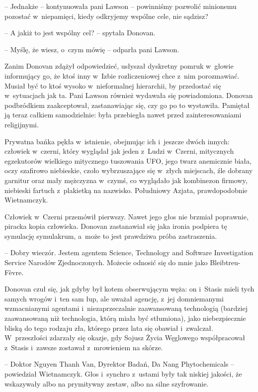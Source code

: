 \documentclass[oneside,polish,11pt,sfheadings]{mwbk}
\begin{document}
-- Jednakże -- kontynuowała pani Lawson -- powinniśmy pozwolić minionemu
pozostać w~niepamięci, kiedy odkryjemy wspólne cele, nie sądzisz?

-- A jakiż to jest wspólny cel? -- spytała Donovan.

-- Myślę, że wiesz, o~czym mówię -- odparła pani Lawson.

Zanim Donovan zdążył odpowiedzieć, usłyszał dyskretny pomruk w~głowie
informujący go, że ktoś inny w~Izbie rozliczeniowej chce z~nim
porozmawiać. Musiał być to ktoś wysoko w~nieformalnej hierarchii, by
przedostać się w~sytuacjach jak ta. Pani Lawson również wydawała się
powiadomiona. Donovan podbródkiem zaakceptował, zastanawiając się, czy
go po to wystawiła. Pamiętał ją teraz całkiem samodzielnie: była
przebiegła nawet przed zainteresowaniami religijnymi.

Prywatna bańka pękła w~istnienie, obejmując ich i~jeszcze dwóch innych:
człowiek w~czerni, który wyglądał jak jeden z~Ludzi w~Czerni, mitycznych
egzekutorów wielkiego mitycznego tuszowania UFO, jego twarz anemicznie
biała, oczy szafirowo niebieskie, czoło wybrzuszające się w~złych
miejscach, źle dobrany garnitur oraz mały mężczyzna w~czymś, co
wyglądało jak kombinezon firmowy, niebieski fartuch z~plakietką na
nazwisko. Południowy Azjata, prawdopodobnie Wietnamczyk.

Człowiek w~Czerni przemówił pierwszy. Nawet jego głos nie brzmiał
poprawnie, piracka kopia człowieka. Donovan zastanawiał się jaka ironia
podpiera tę symulację symulakrum, a~może to jest prawdziwa próba
zastraszenia.

-- Dobry wieczór. Jestem agentem Science, Technology and Software
Investigation Service Narodów Zjednoczonych. Możecie odnosić się do mnie
jako Bleibtreu-Fèvre.

Donovan czuł się, jak gdyby był kotem obserwującym węża: on i~Stasis
mieli tych samych wrogów i~ten sam łup, ale uważał agencję, z~jej
domniemanymi wzmacnianymi agentami i~niezaprzeczalnie zaawansowaną
technologią (bardziej zaawansowaną niż technologia, którą miała być
stłumiona), jako niebezpiecznie bliską do tego rodzaju zła, którego
przez lata się obawiał i~zwalczał. W~przeszłości zdarzały się okazje,
gdy Sojusz Życia Węglowego współpracował z~Stasis i~zawsze zostawał z~mrowieniem na skórze.

-- Doktor Nguyen Thanh Van, Dyrektor Badań, Da Nang Phytochemicals -- powiedział Wietnamczyk. Głos i~synchro z~ustami były tak niskiej
jakości, że wskazywały albo na prymitywny zestaw, albo na silne
szyfrowanie.
\end{document}
